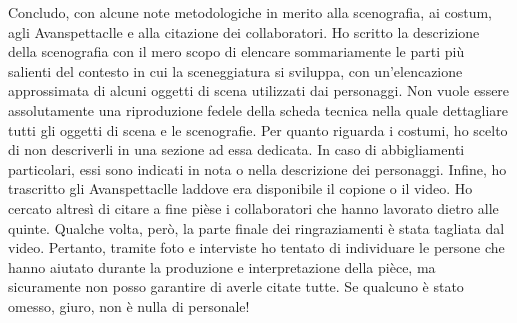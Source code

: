 Concludo, con alcune note metodologiche in merito alla scenografia, ai costum, agli Avanspettaclle e alla citazione dei collaboratori. 
Ho scritto la descrizione della scenografia con il mero scopo di elencare sommariamente le parti più salienti del contesto in cui la sceneggiatura si sviluppa, con un'elencazione approssimata di alcuni oggetti di scena utilizzati dai personaggi. Non vuole essere assolutamente una riproduzione fedele della scheda tecnica nella quale dettagliare tutti gli oggetti di scena e le scenografie. 
Per quanto riguarda i costumi, ho scelto di non descriverli in una sezione ad essa dedicata. In caso di abbigliamenti particolari, essi sono indicati in nota o nella descrizione dei personaggi.
Infine, ho trascritto gli Avanspettaclle laddove era disponibile il copione o il video. Ho cercato altresì di citare a fine pièse i collaboratori che hanno lavorato dietro alle quinte. Qualche volta, però, la parte finale dei ringraziamenti è stata tagliata dal video. Pertanto, tramite foto e interviste ho tentato di individuare le persone che hanno aiutato durante la produzione e interpretazione della pièce, ma sicuramente non posso garantire di averle citate tutte. Se qualcuno è stato omesso, giuro, non è nulla di personale!

